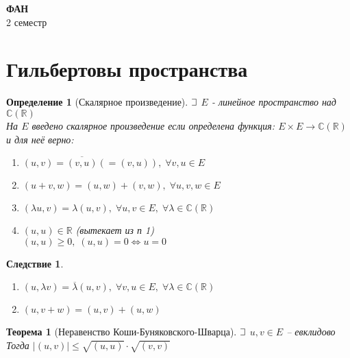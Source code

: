 \documentclass{article}
\theoremstyle{truestyle}
\newtheorem*{defenition}{Определение}
\newtheorem*{theorem}{Теорема}
\newtheorem*{sled}{Следствие}
\def\letus{%
	\mathord{\setbox0=\hbox{$\exists$}%
		\hbox{\kern 0.125\wd0%
			\vbox to \ht0{%
				\hrule width 0.75\wd0%
				\vfill%
				\hrule width 0.75\wd0}%
			\vrule height \ht0%
			\kern 0.125\wd0}%
	}%
}
\begin{document}
\begin{center}
  {\Large \bf ФАН}\\
  2 семестр
\end{center}

\section*{Гильбертовы пространства}

\begin{defenition}[Скалярное произведение]
  $\letus$ $E$ - линейное пространство над $\mathbb{C}(\mathbb{R})$\\
  На $E$ введено скалярное произведение если определена функция: $E \times E \rightarrow \mathbb{C}(\mathbb{R})$ и для неё верно:\\
  \begin{minipage}[t]{0.8\linewidth}\begin{enumerate}[itemsep=1mm]
      \item $(u, v) = \overline{(v, u)} (= (v, u)), \; \forall v, u \in E$
      \item $(u + v, w) = (u, w) + (v, w), \; \forall u, v, w \in E$
      \item $(\lambda u, v) = \lambda(u, v), \; \forall u, v \in E, \; \forall \lambda \in \mathbb{C}(\mathbb{R})$
      \item $(u, u) \in \mathbb{R}$ (вытекает из п 1) \\
      $(u, u) \ge 0, \; (u, u) = 0 \Leftrightarrow u = 0$ 
    \end{enumerate}\end{minipage}
\end{defenition}

\begin{sled} 
	\begin{minipage}[t]{0.8\linewidth}\begin{enumerate}
		\item  $(u, \lambda v) = \overline\lambda(u, v), \; \forall v, u \in E, \; \forall \lambda \in \mathbb{C}(\mathbb{R})$
		\item  $(u, v+w) = (u, v) + (u, w)$
	\end{enumerate}\end{minipage}
\end{sled}

\begin{theorem}[Неравенство Коши-Буняковского-Шварца]
  $\letus$ $u, v \in E$ -- евклидово\\
  Тогда $|(u, v)| \le \sqrt{(u, u)} \cdot \sqrt{(v, v)}$ 
\end{theorem}
\end{document}
